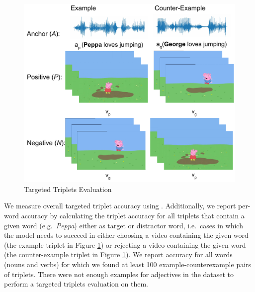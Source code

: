 \begin{figure}
  \centering
  \includegraphics[width=\columnwidth]{peppa_targeted_triplets.pdf}
  \caption{Targeted Triplets Evaluation}
  \label{fig:targeted_triplets}
\end{figure}

We measure overall targeted triplet accuracy using
. Additionally, we report per-word accuracy by
calculating the triplet accuracy for all triplets that contain a given
word (e.g.\ \textit{Peppa}) either as target or distractor word, i.e.\ cases
in which the model needs to succeed in either choosing a video
containing the given word (the example triplet in Figure
\ref{fig:targeted_triplets}) or rejecting a video containing the given
word (the counter-example triplet in Figure
\ref{fig:targeted_triplets}).
We report accuracy for all words (nouns and verbs) for which we found at least 100 example-counterexample pairs of triplets. There were not enough examples for adjectives in the dataset to perform a targeted triplets evaluation on them. 



